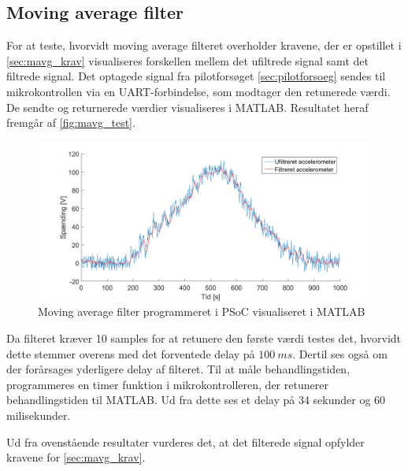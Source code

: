 \subsection{Moving average filter}
For at teste, hvorvidt moving average filteret overholder kravene, der er opstillet i \autoref{sec:mavg_krav} visualiseres forskellen mellem det ufiltrede signal samt det filtrede signal. Det optagede signal fra pilotforsøget \autoref{sec:pilotforsoeg} sendes til mikrokontrollen via en UART-forbindelse, som modtager den retunerede værdi. De sendte og returnerede værdier visualiseres i MATLAB. Resultatet heraf fremgår af \autoref{fig:mavg_test}. 

\begin{figure}[H]
	\centering
	\includegraphics[width=1\textwidth]{figures/accelerometer_filter}
	\caption{Moving average filter programmeret i PSoC visualiseret i MATLAB}
	\label{fig:mavg_test}
\end{figure}


\noindent
Da filteret kræver 10 samples for at retunere den første værdi testes det, hvorvidt dette stemmer overens med det forventede delay på $100~ms$. Dertil ses også om der forårsages yderligere delay af filteret. Til at måle behandlingstiden, programmeres en timer funktion i mikrokontrolleren, der retunerer behandlingstiden til MATLAB. Ud fra dette ses et delay på 34 sekunder og 60 milisekunder.

Ud fra ovenstående resultater vurderes det, at det filterede signal opfylder kravene for \autoref{sec:mavg_krav}. 